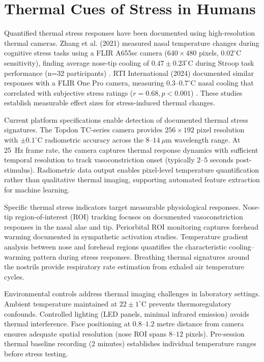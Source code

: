 \documentclass{report}
\begin{document}
    \section{Thermal Cues of Stress in Humans}
    \label{sec:thermal_cues}

    Quantified thermal stress responses have been documented using high-resolution thermal cameras. Zhang et al. (2021) measured nasal temperature changes during cognitive stress tasks using a FLIR A655sc camera ($640 \times 480$ pixels, $0.02^{\circ}$C sensitivity), finding average nose-tip cooling of $0.47 \pm 0.23^{\circ}$C during Stroop task performance (n=32 participants) \cite{zhang2021}. RTI International (2024) documented similar responses with a FLIR One Pro camera, measuring $0.3$--$0.7^{\circ}$C nasal cooling that correlated with subjective stress ratings ($r = 0.68, p < 0.001$) \cite{rti2024}. These studies establish measurable effect sizes for stress-induced thermal changes.

    Current platform specifications enable detection of documented thermal stress signatures. The Topdon TC-series camera provides $256 \times 192$ pixel resolution with $\pm 0.1^{\circ}$C radiometric accuracy across the $8$--$14~\mu$m wavelength range. At 25~Hz frame rate, the camera captures thermal response dynamics with sufficient temporal resolution to track vasoconstriction onset (typically $2$--$5$ seconds post-stimulus). Radiometric data output enables pixel-level temperature quantification rather than qualitative thermal imaging, supporting automated feature extraction for machine learning.

    Specific thermal stress indicators target measurable physiological responses. Nose-tip region-of-interest (ROI) tracking focuses on documented vasoconstriction responses in the nasal alae and tip. Periorbital ROI monitoring captures forehead warming documented in sympathetic activation studies. Temperature gradient analysis between nose and forehead regions quantifies the characteristic cooling--warming pattern during stress responses. Breathing thermal signatures around the nostrils provide respiratory rate estimation from exhaled air temperature cycles.

    Environmental controls address thermal imaging challenges in laboratory settings. Ambient temperature maintained at $22 \pm 1^{\circ}$C prevents thermoregulatory confounds. Controlled lighting (LED panels, minimal infrared emission) avoids thermal interference. Face positioning at $0.8$--$1.2$ metre distance from camera ensures adequate spatial resolution (nose ROI spans $8$--$12$ pixels). Pre-session thermal baseline recording (2 minutes) establishes individual temperature ranges before stress testing.
\end{document}
